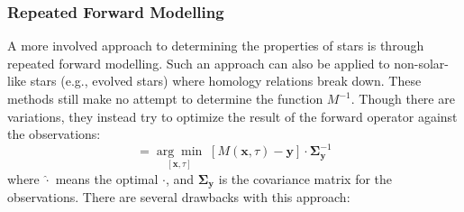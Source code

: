 



\subsubsection*{Repeated Forward Modelling} 
A more involved approach to determining the properties of stars is through repeated forward modelling. 
Such an approach can also be applied to non-solar-like stars (e.g., evolved stars) where homology relations break down. 
These methods still make no attempt to determine the function $M^{-1}$. 
Though there are variations, they instead try to optimize the result of the forward operator against the observations: 
\begin{equation}
    [\hat{\mathbf x}, \hat\tau]
    =
    \underset{[\mathbf x, \tau]}{\arg\min}\; \left[
        M(\mathbf x, \tau)
        -
        \mathbf y
    \right] 
    \cdot
    \boldsymbol{\Sigma}_{\mathbf y}^{-1}
\end{equation}
where $\hat\cdot$ means the optimal $\cdot$, and $\boldsymbol\Sigma_{\mathbf y}$ is the covariance matrix for the observations. 
There are several drawbacks with this approach: 
